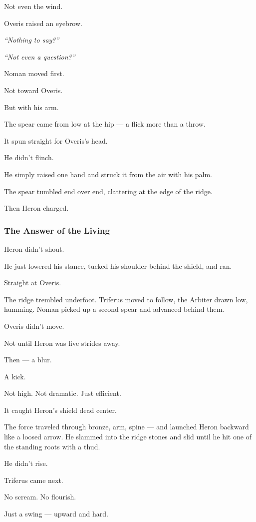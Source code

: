 \documentclass[12pt]{article}
\begin{document}
Not even the wind.

Overis raised an eyebrow.

\textit{“Nothing to say?”}

\textit{“Not even a question?”}

Noman moved first.

Not toward Overis.

But with his arm.

The spear came from low at the hip — a flick more than a throw.

It spun straight for Overis’s head.

He didn’t flinch.

He simply raised one hand and struck it from the air with his palm.

The spear tumbled end over end, clattering at the edge of the ridge.

Then Heron charged.

\dotfill

\subsubsection*{The Answer of the Living}

Heron didn’t shout.

He just lowered his stance, tucked his shoulder behind the shield, and ran.

Straight at Overis.

The ridge trembled underfoot. Triferus moved to follow, the Arbiter drawn low, humming. Noman picked up a second spear and advanced behind them.

Overis didn’t move.

Not until Heron was five strides away.

Then — a blur.

A kick.

Not high. Not dramatic. Just efficient.

It caught Heron’s shield dead center.

The force traveled through bronze, arm, spine — and launched Heron backward like a loosed arrow. He slammed into the ridge stones and slid until he hit one of the standing roots with a thud.

He didn’t rise.

\bigskip

Triferus came next.

No scream. No flourish.

Just a swing — upward and hard.
\end{document}

